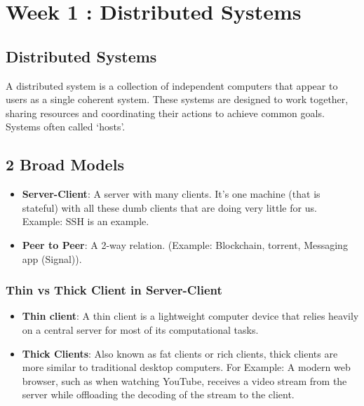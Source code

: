 \section{Week 1 : Distributed Systems}

\subsection{Distributed Systems}
A distributed system is a collection of independent computers that appear to users as a single coherent system. These systems are designed to work together, sharing resources and coordinating their actions to achieve common goals. Systems often called ‘hosts’.

\subsection{2 Broad Models}
\begin{itemize}[noitemsep, topsep=4pt]
    \item \textbf{Server-Client}: A server with many clients. It's one machine (that is stateful) with all these dumb clients that are doing very little for us. Example: SSH is an example.
    \item \textbf{Peer to Peer}: A 2-way relation. (Example: Blockchain, torrent, Messaging app (Signal)).
\end{itemize}

\subsubsection{Thin vs Thick Client in Server-Client}
\begin{itemize}[noitemsep,  leftmargin=*,label=, topsep=1pt] 
	\item \textbf{Thin client}: A thin client is a lightweight computer device that relies heavily on a central server for most of its computational tasks. \\
	\item \textbf{Thick Clients}: Also known as fat clients or rich clients, thick clients are more similar to traditional desktop computers. For Example: A modern web browser, such as when watching YouTube, receives a video stream from the server while offloading the decoding of the stream to the client.
\end{itemize}

